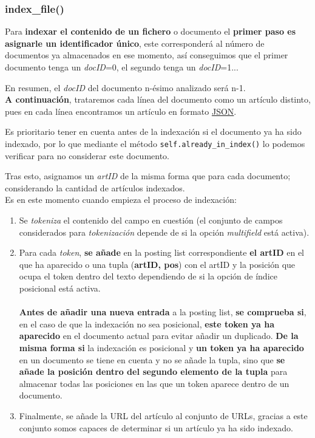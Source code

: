 \documentclass[12pt,a4paper]{article}
\begin{document}
\subsubsection{index\_file()}
Para \textbf{indexar el contenido de un fichero} o documento el \textbf{primer paso es asignarle un identificador único}, este corresponderá al número de documentos ya almacenados en ese momento, así conseguimos que el primer documento tenga un \textit{docID}=0, el segundo tenga un \textit{docID}=1... 

En resumen, el \textit{docID} del documento n-ésimo analizado será n-1.\\

\textbf{A continuación}, trataremos cada línea del documento como un artículo distinto, pues en cada línea encontramos un artículo en formato \href{https://en.wikipedia.org/wiki/JSON}{JSON}.

Es prioritario tener en cuenta antes de la indexación si el documento ya ha sido indexado, por lo que mediante el método \texttt{self.already\_in\_index()} lo podemos verificar para no considerar este documento.

Tras esto, asignamos un \textit{artID} de la misma forma que para cada documento; considerando la cantidad de artículos indexados.\\

Es en este momento cuando empieza el proceso de indexación:

\begin{enumerate}
  \item Se \textit{tokeniza} el contenido del campo en cuestión (el conjunto de campos considerados para \textit{tokenización} depende de si la opción \textit{multifield} está activa).
  \item Para cada \textit{token}, \textbf{se añade} en la posting list correspondiente \textbf{el artID} en el que ha aparecido o una tupla (\textbf{artID, pos}) con el artID y la posición que ocupa el token dentro del texto dependiendo de si la opción de índice posicional está activa. \\ \\
  \textbf{Antes de añadir una nueva entrada} a la posting list, \textbf{se comprueba si}, en el caso de que la indexación no sea posicional, \textbf{este token ya ha aparecido} en el documento actual para evitar añadir un duplicado. \textbf{De la misma forma si} la indexación es posicional y \textbf{un token ya ha aparecido} en un documento se tiene en cuenta y no se añade la tupla, sino que \textbf{se añade la posición dentro del segundo elemento de la tupla} para almacenar todas las posiciones en las que un token aparece dentro de un documento.
  \item Finalmente, se añade la URL del artículo al conjunto de URLs, gracias a este conjunto somos capaces de determinar si un artículo ya ha sido indexado.
\end{enumerate}
\end{document}
